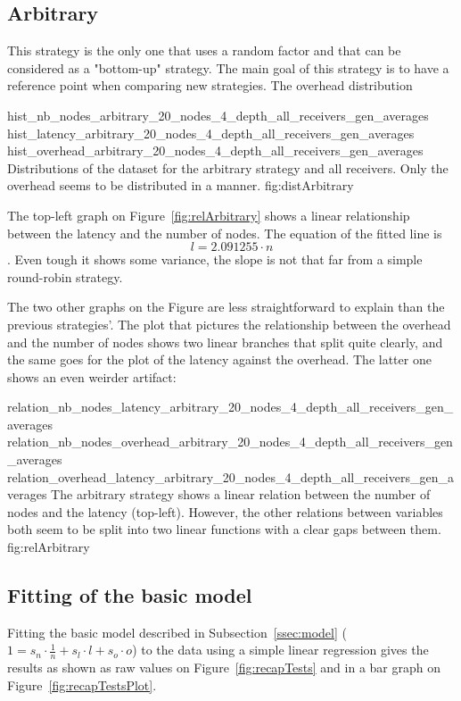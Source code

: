 \subsection{Arbitrary}
\label{ssec:arbitrary}

This strategy is the only one that uses a random factor and that can be
considered as a "bottom-up" strategy. The main goal of this strategy is to
have a reference point when comparing new strategies.
The overhead distribution 


\triplefigure
    {hist_nb_nodes_arbitrary_20_nodes_4_depth_all_receivers_gen_averages}
    {hist_latency_arbitrary_20_nodes_4_depth_all_receivers_gen_averages}
    {hist_overhead_arbitrary_20_nodes_4_depth_all_receivers_gen_averages}
    {Distributions of the dataset for the arbitrary strategy and all
    receivers. Only the overhead seems to be distributed in a  manner. }
    {fig:distArbitrary}

The top-left graph on Figure~\ref{fig:relArbitrary} shows a linear relationship
between the latency and the number of nodes. The equation of the fitted line is
\[l = 2.091255 \cdot n\]. Even tough it shows some variance, the slope is
not that far from a simple round-robin strategy. 

The two other graphs on the Figure are less straightforward to explain than the
previous strategies'. The plot that pictures the relationship between the
overhead and the number of nodes shows two linear branches that split quite
clearly, and the same goes for the plot of the latency against the overhead.
The latter one shows an even weirder artifact: 




\triplefigure
    {relation_nb_nodes_latency_arbitrary_20_nodes_4_depth_all_receivers_gen_averages}
    {relation_nb_nodes_overhead_arbitrary_20_nodes_4_depth_all_receivers_gen_averages}
    {relation_overhead_latency_arbitrary_20_nodes_4_depth_all_receivers_gen_averages}
    {The arbitrary strategy shows a linear relation between the number of
    nodes and the latency (top-left). However, the other relations between
    variables both seem to be split into two linear functions with a clear gaps
    between them.}
    {fig:relArbitrary}


\subsection{Fitting of the basic model}
Fitting the basic model described in Subsection~\ref{ssec:model} (\(1 = s_n
\cdot \frac{1}{n} + s_l\cdot l + s_o\cdot o\)) to the data using a simple linear
regression gives the results as shown as raw values on
Figure~\ref{fig:recapTests} and in a bar graph on
Figure~\ref{fig:recapTestsPlot}.

